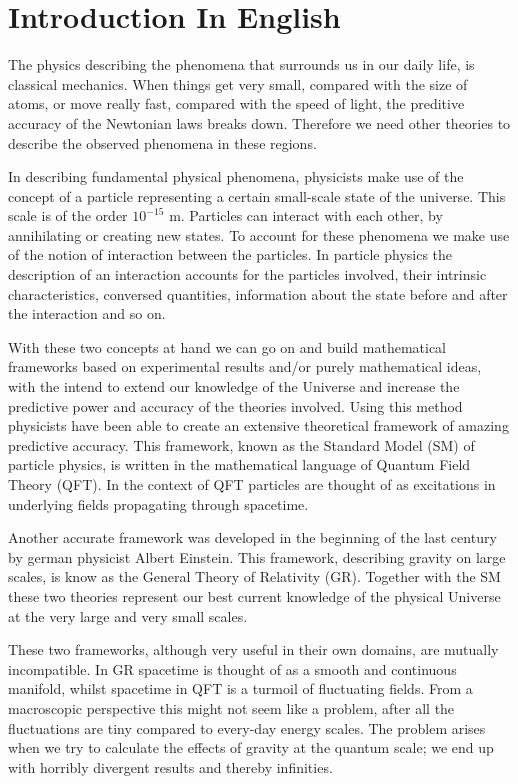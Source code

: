 \section{Introduction In English}
The physics describing the phenomena that surrounds us in our daily life, is classical mechanics. When things get very small, compared with the size of atoms, or move really fast, compared with the speed of light, the preditive accuracy of the Newtonian laws breaks down. Therefore we need other theories to describe the observed phenomena in these regions.

In describing fundamental physical phenomena, physicists make use of the concept of a particle representing a certain small-scale state of the universe. This scale is of the order $10^{-15}$ m. Particles can interact with each other, by annihilating or creating new states. To account for these phenomena we make use of the notion of interaction between the particles. In particle physics the description of an interaction accounts for the particles involved, their intrinsic characteristics, conversed quantities, information about the state before and after the interaction and so on.

With these two concepts at hand we can go on and build mathematical frameworks based on experimental results and/or purely mathematical ideas, with the intend to extend our knowledge of the Universe and increase the predictive power and accuracy of the theories involved. Using this method physicists have been able to create an extensive theoretical framework of amazing predictive accuracy. This framework, known as the Standard Model (SM) of particle physics, is written in the mathematical language of Quantum Field Theory (QFT). In the context of QFT particles are thought of as excitations in underlying fields propagating through spacetime.

Another accurate framework was developed in the beginning of the last century by german physicist Albert Einstein. This framework, describing gravity on large scales, is know as the General Theory of Relativity (GR). Together with the SM these two theories represent our best current knowledge of the physical Universe at the very large and very small scales.

These two frameworks, although very useful in their own domains, are mutually incompatible. In GR spacetime is thought of as a smooth and continuous manifold, whilst spacetime in QFT is a turmoil of fluctuating fields. From a macroscopic perspective this might not seem like a problem, after all the fluctuations are tiny compared to every-day energy scales. The problem arises when we try to calculate the effects of gravity at the quantum scale; we end up with horribly divergent results and thereby infinities.

